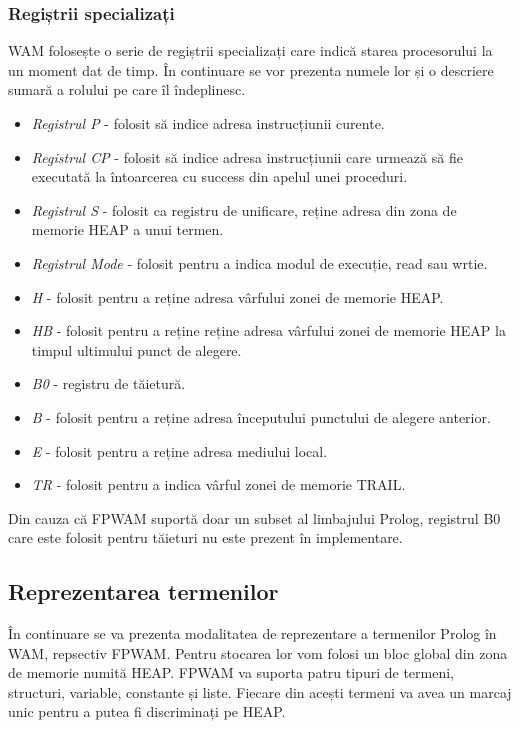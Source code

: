 \documentclass[12pt,a4paper,twoside]{report}
\begin{document}
\subsubsection{Regiștrii specializați}
WAM folosește o serie de regiștrii specializați care indică starea procesorului la un moment dat de timp. În continuare se vor prezenta numele lor și o descriere sumară a rolului pe care îl îndeplinesc.
\begin{itemize}
	\item \textit{Registrul P} - folosit să indice adresa instrucțiunii curente.
	\item \textit{Registrul CP} - folosit să indice adresa instrucțiunii care urmează să fie executată la întoarcerea cu success din apelul unei proceduri.
	\item \textit{Registrul S} - folosit ca registru de unificare, reține adresa din zona de memorie HEAP a unui termen.
	\item \textit{Registrul Mode} - folosit pentru a indica modul de execuție, read sau wrtie.
	\item \textit{H} - folosit pentru a reține adresa vârfului zonei de memorie HEAP.
	\item \textit{HB} - folosit pentru a reține reține adresa vârfului zonei de memorie HEAP la timpul ultimului punct de alegere.
	\item \textit{B0} - registru de tăietură.
	\item \textit{B} - folosit pentru a reține adresa începutului punctului de alegere anterior.
	\item \textit{E} - folosit pentru a reține adresa mediului local.
	\item \textit{TR} - folosit pentru a indica vârful zonei de memorie TRAIL.
\end{itemize}

Din cauza că FPWAM suportă doar un subset al limbajului Prolog, registrul B0 care este folosit pentru tăieturi nu este prezent în implementare.

\subsection{Reprezentarea termenilor}
În continuare se va prezenta modalitatea de reprezentare a termenilor Prolog în WAM, repsectiv FPWAM. Pentru stocarea lor vom folosi un bloc global din zona de memorie numită HEAP. FPWAM va suporta patru tipuri de termeni, structuri, variable, constante și liste. Fiecare din acești termeni va avea un marcaj unic pentru a putea fi discriminați pe HEAP. 
\end{document}
